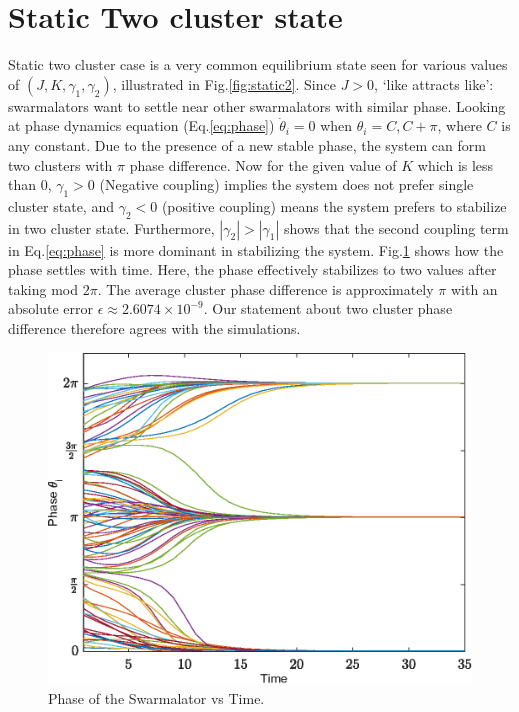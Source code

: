 \documentclass[superscriptaddress,reprint,amssymb, amsmath,aps, pre]{revtex4-1}
\begin{document}
{    \section{Static Two cluster state}
    {
        Static two cluster case is a very common equilibrium state seen for various values of \((J,K,\gamma_1,\gamma_2)\), illustrated in  Fig.\ref{fig:static2}. Since \(J > 0\), `like attracts like': swarmalators want to settle near other swarmalators with similar phase. Looking at phase dynamics equation (Eq.\ref{eq:phase}) \(\dot{\theta}_{i} = 0\) when \(\theta_i = C, C + \pi \), where \(C\) is any constant. Due to the presence of a new stable phase, the system can form two clusters with \(\pi\) phase difference. Now for the given value of \(K\) which is less than 0, \(\gamma_1 > 0\) (Negative coupling) implies the system does not prefer single cluster state, and \(\gamma_2 < 0\) (positive coupling) means the system prefers to stabilize in two cluster state. Furthermore, \(|\gamma_2| > |\gamma_1|\) shows that the second coupling term in Eq.\ref*{eq:phase} is more dominant in stabilizing the system. Fig.\ref{fig:phasevsTime} shows how the phase settles with time. Here, the phase effectively stabilizes to two values after taking mod \(2\pi\). The average cluster phase difference is approximately \(\pi\) with an absolute error \(\epsilon \approx 2.6074 \times 10^{-9}\). Our statement about two cluster phase difference therefore agrees with the simulations. 

        \begin{figure}
            \includegraphics[width = \linewidth]{phasevstimeN_100.eps}
            \caption{Phase of the Swarmalator vs Time. }
            \label{fig:phasevsTime}
        \end{figure}
    }
    
}
\end{document}
